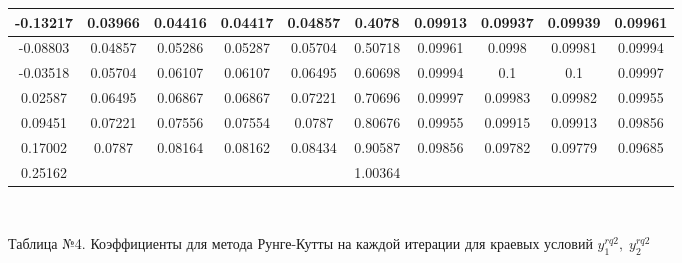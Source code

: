 \begin{center}
\begin{table}[htbp]
\begin{tabular}{|c|c|c|c|c|c|c|c|c|c|}
			\hline
			-0.13217 & 0.03966 & 0.04416 & 0.04417 & 0.04857 & 0.4078 & 0.09913 & 0.09937 & 0.09939 & 0.09961 \\
			\hline
			-0.08803 & 0.04857 & 0.05286 & 0.05287 & 0.05704 & 0.50718 & 0.09961 & 0.0998 & 0.09981 & 0.09994 \\
			\hline
			-0.03518 & 0.05704 & 0.06107 & 0.06107 & 0.06495 & 0.60698 & 0.09994 & 0.1 & 0.1 & 0.09997 \\
			\hline
			0.02587 & 0.06495 & 0.06867 & 0.06867 & 0.07221 & 0.70696 & 0.09997 & 0.09983 & 0.09982 & 0.09955 \\
			\hline
			0.09451 & 0.07221 & 0.07556 & 0.07554 & 0.0787 & 0.80676 & 0.09955 & 0.09915 & 0.09913 & 0.09856 \\
			\hline
			0.17002 & 0.0787 & 0.08164 & 0.08162 & 0.08434 & 0.90587 & 0.09856 & 0.09782 & 0.09779 & 0.09685 \\
			\hline
			0.25162 & & & & & 1.00364 & & & & \\
			\hline
		\end{tabular}\\
	\end{table}
\color{blue}
Таблица №4. Коэффициенты для метода Рунге-Кутты на каждой итерации для краевых условий $ y^{rq2}_{1}, \; y^{rq2}_{2} $ 
\end{center}